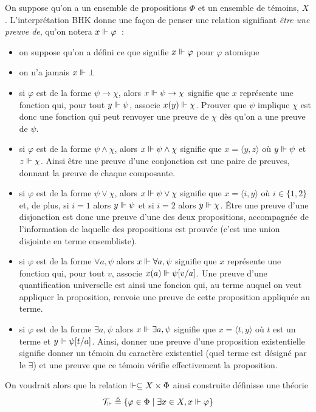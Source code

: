\documentclass{article}
\begin{document}
On suppose qu'on a un ensemble de propositions $\Phi$ et un ensemble de témoins, $X$. L'interprétation BHK donne une façon de penser une relation signifiant \textit{être une preuve de}, qu'on notera $x\Vdash \varphi$~:
\begin{itemize}
\item on suppose qu'on a défini ce que signifie $x\Vdash\varphi$ pour $\varphi$ atomique
\item on n'a jamais $x\Vdash \bot$
\item si $\varphi$ est de la forme $\psi\to \chi$, alors $x\Vdash\psi \to\chi$ signifie que $x$ représente une fonction qui, pour tout $y\Vdash\psi$, associe $x(y)\Vdash\chi$. Prouver que $\psi$ implique $\chi$ est donc une fonction qui peut renvoyer une preuve de $\chi$ dès qu'on a une preuve de $\psi$.
\item si $\varphi$ est de la forme $\psi\land\chi$, alors $x\Vdash \psi\land \chi$ signifie que $x = \langle y,z\rangle$ où $y\Vdash \psi$ et $z\Vdash \chi$. Ainsi être une preuve d'une conjonction est une paire de preuves, donnant la preuve de chaque composante.
\item si $\varphi$ est de la forme $\psi\lor\chi$, alors $x\Vdash\psi\lor \chi$ signifie que $x = \langle i,y\rangle$ où $i\in\{1,2\}$ et, de plus, si $i = 1$ alors $y\Vdash \psi$ et si $i = 2$ alors $y\Vdash \chi$. Être une preuve d'une disjonction est donc une preuve d'une des deux propositions, accompagnée de l'information de laquelle des propositions est prouvée (c'est une union disjointe en terme ensembliste).
\item si $\varphi$ est de la forme $\forall a, \psi$ alors $x\Vdash\forall a, \psi$ signifie que $x$ représente une fonction qui, pour tout $v$, associe $x(a)\Vdash \psi[v/a]$. Une preuve d'une quantification universelle est ainsi une foncion qui, au terme auquel on veut appliquer la proposition, renvoie une preuve de cette proposition appliquée au terme.
\item si $\varphi$ est de la forme $\exists a, \psi$ alors $x\Vdash \exists a, \psi$ signifie que $x = \langle t,y\rangle$ où $t$ est un terme et $y\Vdash \psi[t/a]$. Ainsi, donner une preuve d'une proposition existentielle signifie donner un témoin du caractère existentiel (quel terme est désigné par le $\exists$) et une preuve que ce témoin vérifie effectivement la proposition.
\end{itemize}

On voudrait alors que la relation $\Vdash\subseteq X \times \Phi$ ainsi construite définisse une théorie
\[\mathcal T_\Vdash \triangleq \{\varphi\in\Phi\mid \exists x \in X, x\Vdash \varphi\}\]
\end{document}
